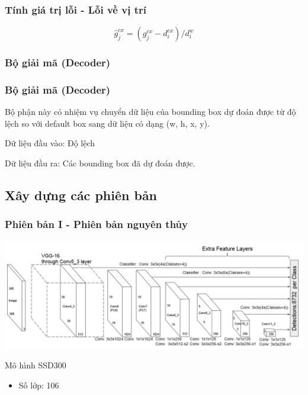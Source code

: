 \documentclass{beamer}
\begin{document}
	\begin{frame}
		\frametitle{Tính giá trị lỗi - Lỗi về vị trí}
		$$\hat{g}_j^{cx} = (g_j^{cx} - d_i^{cx}) / d^w_i$$
		
	\end{frame}
	
	
	\subsubsection{Bộ giải mã (Decoder)}
	
	\begin{frame}
		\frametitle{Bộ giải mã (Decoder)}
		Bộ phận này có nhiệm vụ chuyển dữ liệu của bounding box dự đoán được từ độ lệch so với default box sang dữ liệu có dạng (w, h, x, y).
		
		Dữ liệu đầu vào: Độ lệch
		
		Dữ liệu đầu ra: Các bounding box đã dự đoán được.
		
	\end{frame}
	
	
	\subsection{Xây dựng các phiên bản}
	\begin{frame}
		\frametitle{Phiên bản I - Phiên bản nguyên thủy}
		\begin{center}
			\centering
			\includegraphics[width=0.95\linewidth]{SSD_Struture.png}
		\end{center}
		\begin{block}{Mô hình SSD300\cite{liu2016ssd}}
			\begin{itemize}
				\item Số lớp: 106
			\end{itemize}
		\end{block}
	\end{frame}
	
\end{document}
